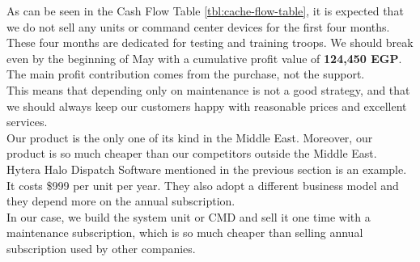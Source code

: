 As can be seen in the Cash  Flow  Table \ref{tbl:cache-flow-table}, it is expected that we do not sell any units or command center devices for the first four months. These four months are dedicated for testing and training troops. We should break even by the beginning of May with a cumulative profit value of \textbf{124,450 EGP}. The main profit contribution comes from the purchase, not the support.
\\
This means that depending only on maintenance is not a good strategy, and that we should always keep our customers happy with reasonable prices and excellent services.
\\
Our product is the only one of its kind in the Middle East. Moreover, our product is so much cheaper than our competitors outside the Middle East. Hytera Halo Dispatch Software mentioned in the previous section is an example. It costs \$999 per unit per year. They also adopt a different business model and they depend more on the annual subscription.
\\
In our case, we build the system unit or CMD and sell it one time with a maintenance subscription, which is so much cheaper than selling annual subscription used by other companies.
